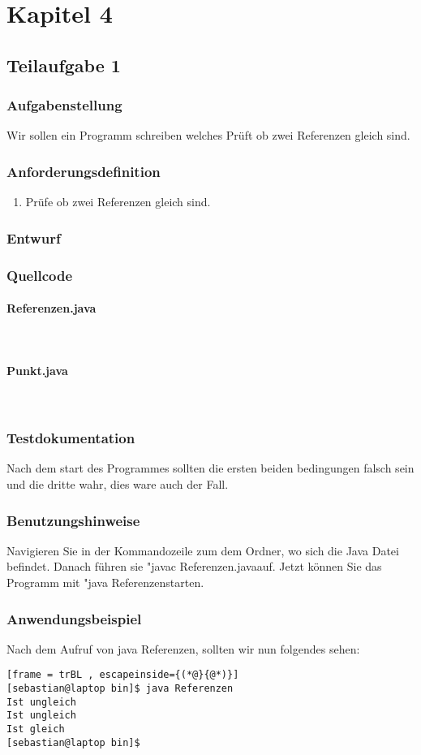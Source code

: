 \section{Kapitel 4}
\subsection{Teilaufgabe 1}
\subsubsection{Aufgabenstellung}
Wir sollen ein Programm schreiben welches Prüft ob zwei Referenzen gleich sind.

\subsubsection{Anforderungsdefinition}
\begin{enumerate}
	\item Prüfe ob zwei Referenzen gleich sind.
\end{enumerate}

\subsubsection{Entwurf}


\subsubsection{Quellcode}
\paragraph{Referenzen.java}\

\paragraph{Punkt.java}\


\subsubsection{Testdokumentation}
Nach dem start des Programmes sollten die ersten beiden bedingungen falsch sein und die dritte wahr, dies ware auch der Fall.

\subsubsection{Benutzungshinweise}
Navigieren Sie in der Kommandozeile zum dem Ordner, wo sich die Java Datei befindet.
Danach führen sie "javac Referenzen.java\dq \space auf. Jetzt können Sie das Programm mit
"java Referenzen\dq \space starten.

\subsubsection{Anwendungsbeispiel}
Nach dem Aufruf von java Referenzen, sollten wir nun folgendes sehen:
\begin{lstlisting}[frame = trBL , escapeinside={(*@}{@*)}]
[sebastian@laptop bin]$ java Referenzen 
Ist ungleich
Ist ungleich
Ist gleich
[sebastian@laptop bin]$  
\end{lstlisting}
